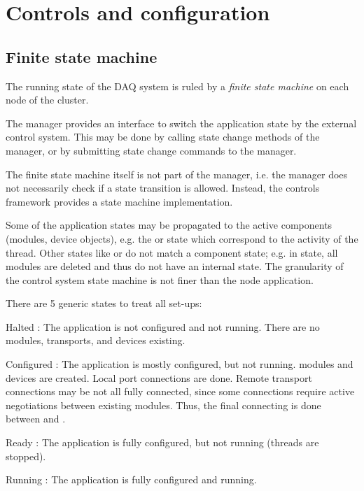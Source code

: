 \section{Controls and configuration}
\subsection{Finite state machine}
The running state of the DAQ system is ruled by a {\sl finite state machine} on 
   each node of the cluster.
\begin{compactitem}[$\circ$]
\item  The manager provides an interface to switch the application 
      state by the external control system. This may be done by calling state 
      change methods of the manager, or by submitting state change commands 
      to the manager.
\item  The finite state machine itself is not part of the manager, 
      i.e. the manager does not necessarily check if a state transition 
      is allowed. Instead, the controls framework provides a 
      state machine implementation.
\item  Some of the application states may be propagated to the 
      active components (modules, device objects), e.g. the 
       or  state which correspond to the activity of the thread. 
      Other states like  or  do not match a component state; 
      e.g. in  state, all modules are deleted and thus do not 
      have an internal state. The granularity of the control system state 
      machine is not finer than the node application.
\item  There are 5 generic states to treat all set-ups: 
\begin{compactdesc}
\item[Halted] : The application is not configured and not running. 
	 There are no modules, transports, and devices existing.
\item[Configured] : The application is mostly configured, but not running. 
	 modules and devices are created. Local port connections are done.
	  Remote transport connections may be not all fully connected, 
	  since some connections require active negotiations between existing 
	  modules. Thus, the final connecting is done between 
	   and .  
\item[Ready] : The application is fully configured, but not running 
	 (threads are stopped).
\item[Running] : The application is fully configured and running.

\end{compactdesc}
\end{compactitem}

